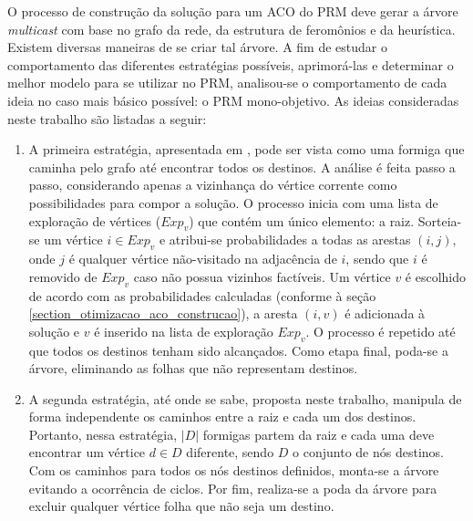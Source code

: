 O processo de construção da solução para um ACO do PRM deve gerar a árvore \textit{multicast} com base no grafo da rede, da estrutura de feromônios e da heurística. Existem diversas maneiras de se criar tal árvore. A fim de estudar o comportamento das diferentes estratégias possíveis, aprimorá-las e determinar o melhor modelo para se utilizar no PRM, analisou-se o comportamento de cada ideia no caso mais básico possível: o PRM mono-objetivo. As ideias consideradas neste trabalho são listadas a seguir:

\begin{enumerate}
	\item A primeira estratégia, apresentada em \cite{Pinto2005}, pode ser vista como uma formiga que caminha pelo grafo até encontrar todos os destinos. A análise é feita passo a passo, considerando apenas a vizinhança do vértice corrente como possibilidades para compor a solução. O processo inicia com uma lista de exploração de vértices ($Exp_v$) que contém um único elemento: a raiz. Sorteia-se um vértice $i \in Exp_v$ e atribui-se probabilidades a todas as arestas $(i, j)$, onde $j$ é qualquer vértice não-visitado na adjacência de $i$, sendo que $i$ é removido de $Exp_v$ caso não possua vizinhos factíveis. Um vértice $v$ é escolhido de acordo com as probabilidades calculadas (conforme à seção \ref{section_otimizacao_aco_construcao}), a aresta $(i, v)$ é adicionada à solução e $v$ é inserido na lista de exploração $Exp_v$. O processo é repetido até que todos os destinos tenham sido alcançados. Como etapa final, poda-se a árvore, eliminando as folhas que não representam destinos.
	\item A segunda estratégia, até onde se sabe, proposta neste trabalho, manipula de forma independente os caminhos entre a raiz e cada um dos destinos. Portanto, nessa estratégia, $|D|$ formigas partem da raiz e cada uma deve encontrar um vértice $d \in D$ diferente, sendo $D$ o conjunto de nós destinos. Com os caminhos para todos os nós destinos definidos, monta-se a árvore evitando a ocorrência de ciclos. Por fim, realiza-se a poda da árvore para excluir qualquer vértice folha que não seja um destino. %

\end{enumerate}
